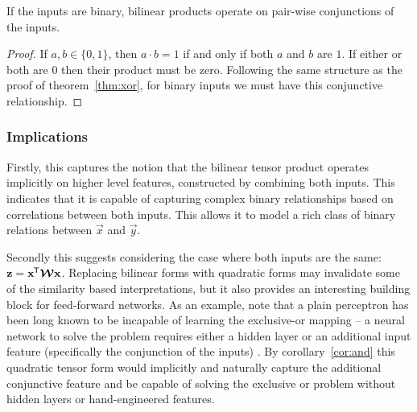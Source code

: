 \begin{cor}\label{cor:and}
If the inputs are binary, bilinear products operate on pair-wise conjunctions of the inputs.
\end{cor}
\begin{proof}
If \(a, b \in \{0, 1\}\), then \(a \cdot b = 1\) if and only if both \(a\) and \(b\) are \(1\). If
either or both are \(0\) then their product must be zero. Following the same structure as the proof
of theorem~\ref{thm:xor}, for binary inputs we must have this conjunctive relationship.
\end{proof}

\subsubsection{Implications}
Firstly, this captures the notion that the bilinear tensor product operates implicitly on higher
level features, constructed by combining both inputs. This indicates that it is capable of capturing
complex binary relationships based on correlations between both inputs. This allows it
to model a rich class of binary relations between \(\vec{x}\) and \(\vec{y}\).

Secondly this suggests considering
the case where both inputs are the same: \(\mathbf{z} = \mathbf{x}^{\mkern-1.5mu\mathsf{T}}\bm{\mathcal{W}}\mathbf{x}\). Replacing
bilinear forms with quadratic forms may invalidate some of the similarity based interpretations,
but it also provides an interesting building block for feed-forward networks. As an example,
note that a plain perceptron has been long known to be incapable of learning the exclusive-or
mapping \autocite{Minsky1969} -- a neural network to solve the problem requires either a hidden layer
or an additional input feature (specifically the conjunction of the inputs) \autocite{Rumelhart1986}.
By corollary~\ref{cor:and} this quadratic tensor form would implicitly and naturally capture the
additional conjunctive feature and be capable of solving the exclusive or problem without hidden
layers or hand-engineered features.

